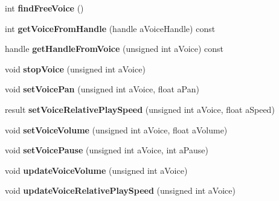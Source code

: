 \begin{DoxyCompactItemize}
\item 
\mbox{\label{class_so_loud_1_1_soloud_a2283ca22bc8e44a6d555dcce0ea3c0b9}} 
int {\bfseries find\+Free\+Voice} ()
\item 
\mbox{\label{class_so_loud_1_1_soloud_ac4ac6fc80c06214bf4997a5dc6a26ba0}} 
int {\bfseries get\+Voice\+From\+Handle} (handle a\+Voice\+Handle) const
\item 
\mbox{\label{class_so_loud_1_1_soloud_a810574859170f0e1e913875ed0191b92}} 
handle {\bfseries get\+Handle\+From\+Voice} (unsigned int a\+Voice) const
\item 
\mbox{\label{class_so_loud_1_1_soloud_aee9974966f4a8155da5e14407b26707e}} 
void {\bfseries stop\+Voice} (unsigned int a\+Voice)
\item 
\mbox{\label{class_so_loud_1_1_soloud_a1bea3a40164c6f0f441ebfb094bb1b97}} 
void {\bfseries set\+Voice\+Pan} (unsigned int a\+Voice, float a\+Pan)
\item 
\mbox{\label{class_so_loud_1_1_soloud_a837347de88ff65441d85edf0e5c775e9}} 
result {\bfseries set\+Voice\+Relative\+Play\+Speed} (unsigned int a\+Voice, float a\+Speed)
\item 
\mbox{\label{class_so_loud_1_1_soloud_a5c7620d76fe708c9549d5c1d1aeec198}} 
void {\bfseries set\+Voice\+Volume} (unsigned int a\+Voice, float a\+Volume)
\item 
\mbox{\label{class_so_loud_1_1_soloud_a591fb5425b90ce2a783f0b54602a439e}} 
void {\bfseries set\+Voice\+Pause} (unsigned int a\+Voice, int a\+Pause)
\item 
\mbox{\label{class_so_loud_1_1_soloud_afa5951cf741e55bd1423e496920b4a25}} 
void {\bfseries update\+Voice\+Volume} (unsigned int a\+Voice)
\item 
\mbox{\label{class_so_loud_1_1_soloud_ae3b33c999d80c73d1d3fc71da9fcaa3d}} 
void {\bfseries update\+Voice\+Relative\+Play\+Speed} (unsigned int a\+Voice)

\end{DoxyCompactItemize}
